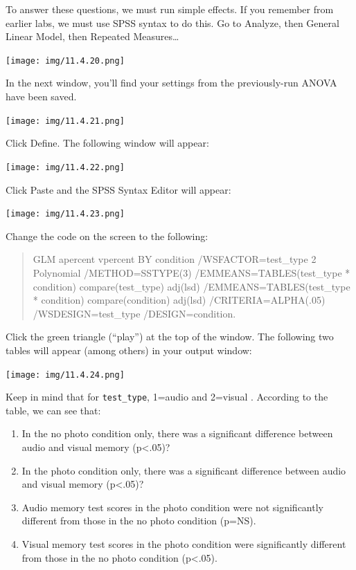 \documentclass[
]{book}
\providecommand{\tightlist}{%
  \setlength{\itemsep}{0pt}\setlength{\parskip}{0pt}}
\begin{document}
To answer these questions, we must run simple effects. If you remember from earlier labs, we must use SPSS syntax to do this. Go to {Analyze}, then {General Linear Model}, then {Repeated Measures\ldots{}}

\texttt{[image: img/11.4.20.png]}

In the next window, you'll find your settings from the previously-run ANOVA have been saved.

\texttt{[image: img/11.4.21.png]}

Click {Define}. The following window will appear:

\texttt{[image: img/11.4.22.png]}

Click {Paste} and the SPSS Syntax Editor will appear:

\texttt{[image: img/11.4.23.png]}

Change the code on the screen to the following:

\begin{quote}
GLM apercent vpercent BY condition
/WSFACTOR=test\_type 2 Polynomial
/METHOD=SSTYPE(3)
/EMMEANS=TABLES(test\_type * condition) compare(test\_type) adj(lsd)
/EMMEANS=TABLES(test\_type * condition) compare(condition) adj(lsd)
/CRITERIA=ALPHA(.05)
/WSDESIGN=test\_type
/DESIGN=condition.
\end{quote}

Click the green triangle ({``play''}) at the top of the window. The following two tables will appear (among others) in your output window:

\texttt{[image: img/11.4.24.png]}

Keep in mind that for \texttt{test\_type}, 1=audio and 2=visual
.
According to the table, we can see that:

\begin{enumerate}
\def\labelenumi{\arabic{enumi}.}
\tightlist
\item
  In the no photo condition only, there was a significant difference between audio and visual memory (p\textless.05)?
\item
  In the photo condition only, there was a significant difference between audio and visual memory (p\textless.05)?
\item
  Audio memory test scores in the photo condition were not significantly different from those in the no photo condition (p=NS).
\item
  Visual memory test scores in the photo condition were significantly different from those in the no photo condition (p\textless.05).
\end{enumerate}
\end{document}

